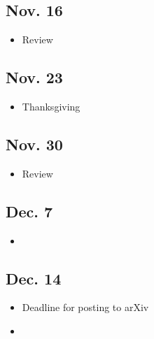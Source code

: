 \documentclass[11pt]{article}
\newenvironment{week}[1]{
\subsection*{#1}
\begin{itemize}
\setlength\itemsep{0mm}
}{
\end{itemize}}
\begin{document}
\begin{multicols}{2}
\begin{week}{Nov. 16}
\item Review
\end{week}

\begin{week}{Nov. 23}
\item Thanksgiving
\end{week}

\begin{week}{Nov. 30}
\item Review
\end{week}

\begin{week}{Dec. 7}
\item {}
\end{week}

\begin{week}{Dec. 14}
\item Deadline for posting to arXiv
\item {}
\end{week}

\end{multicols}
\end{document}
